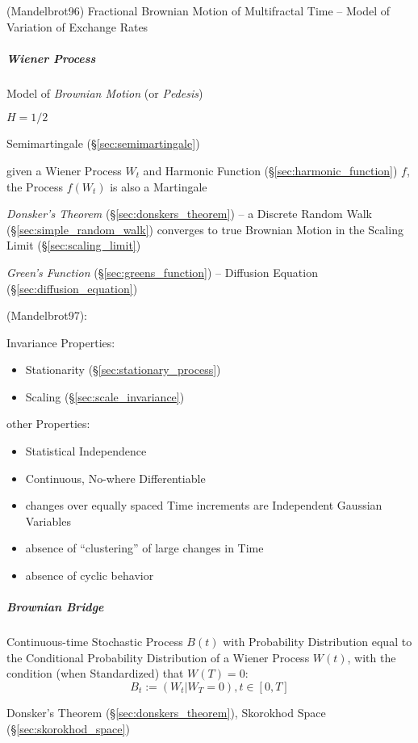 (Mandelbrot96) Fractional Brownian Motion of Multifractal Time -- Model of
Variation of Exchange Rates



\subparagraph{Wiener Process}\label{sec:wiener_process}\hfill

Model of \emph{Brownian Motion} (or \emph{Pedesis})

$H = 1/2$

Semimartingale (\S\ref{sec:semimartingale})

given a Wiener Process $W_t$ and Harmonic Function
(\S\ref{sec:harmonic_function}) $f$, the Process $f(W_t)$ is also a Martingale

\emph{Donsker's Theorem} (\S\ref{sec:donskers_theorem}) -- a Discrete Random
Walk (\S\ref{sec:simple_random_walk}) converges to true Brownian Motion in the
Scaling Limit (\S\ref{sec:scaling_limit})

\emph{Green's Function} (\S\ref{sec:greens_function}) -- Diffusion Equation
(\S\ref{sec:diffusion_equation})

(Mandelbrot97):

Invariance Properties:
\begin{itemize}
  \item Stationarity (\S\ref{sec:stationary_process})
  \item Scaling (\S\ref{sec:scale_invariance})
\end{itemize}

other Properties:
\begin{itemize}
  \item Statistical Independence
  \item Continuous, No-where Differentiable
  \item changes over equally spaced Time increments are Independent Gaussian
    Variables
  \item absence of ``clustering'' of large changes in Time
  \item absence of cyclic behavior
\end{itemize}



\subparagraph{Brownian Bridge}\label{sec:brownian_bridge}\hfill

Continuous-time Stochastic Process $B(t)$ with Probability Distribution equal to
the Conditional Probability Distribution of a Wiener Process $W(t)$, with the
condition (when Standardized) that $W(T) = 0$:
\[
  B_t := (W_t | W_T = 0), t \in [0,T]
\]

\fist Donsker's Theorem (\S\ref{sec:donskers_theorem}), Skorokhod Space
(\S\ref{sec:skorokhod_space})



